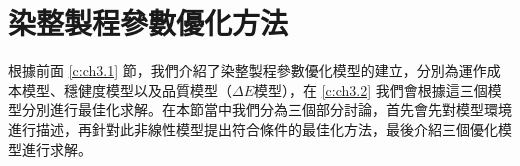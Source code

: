 \chapter{染整製程參數優化方法}
\label{c:opt_method}
根據前面 \ref{c:ch3.1} 節，我們介紹了染整製程參數優化模型的建立，分別為運作成本模型、穩健度模型以及品質模型（$\Delta E$模型），在 \ref{c:ch3.2} 我們會根據這三個模型分別進行最佳化求解。在本節當中我們分為三個部分討論，首先會先對模型環境進行描述，再針對此非線性模型提出符合條件的最佳化方法，最後介紹三個優化模型進行求解。